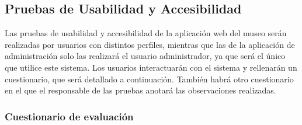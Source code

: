 \subsection{Pruebas de Usabilidad y Accesibilidad} 
Las pruebas de usabilidad y accesibilidad de la aplicación web del museo serán realizadas por usuarios con distintos perfiles, mientras que las de la aplicación de administración solo las realizará el usuario administrador, ya que será el único que utilice este sistema. Los usuarios interactuarán con el sistema y rellenarán un cuestionario, que será detallado a continuación. También habrá otro cuestionario en el que el responsable de las pruebas anotará las observaciones realizadas.

\subsubsection{Cuestionario de evaluación}\label{sec:cuestionario-usabilidad}
